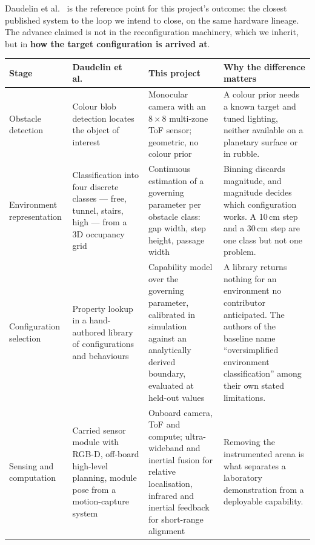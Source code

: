 \documentclass[11pt,a4paper]{article}
\newif\ifreview
\newcommand{\pending}[1]{\ifreview{\color{blue}#1}\else#1\fi}
\newenvironment{pblock}{\ifreview\color{blue}\fi}{}
\begin{document}
\pending{%
Daudelin et al.\ \cite{daudelin2018} is the reference point for this project's
outcome: the closest published system to the loop we intend to close, on the
same hardware lineage. The advance claimed is not in the reconfiguration
machinery, which we inherit, but in \textbf{how the target configuration is
arrived at}.
}

\begin{pblock}
\noindent
\begin{tabular}{@{}L{0.16\textwidth} L{0.23\textwidth} L{0.24\textwidth}
                  L{0.26\textwidth}@{}}
\toprule
\textbf{Stage} & \textbf{Daudelin et al.\ \cite{daudelin2018}} &
\textbf{This project} & \textbf{Why the difference matters} \\
\midrule
Obstacle detection &
  Colour blob detection locates the object of interest &
  Monocular camera with an $8\times8$ multi-zone ToF sensor; geometric, no
  colour prior &
  A colour prior needs a known target and tuned lighting, neither available on
  a planetary surface or in rubble. \\
Environment representation &
  Classification into four discrete classes --- free, tunnel, stairs, high ---
  from a 3D occupancy grid &
  Continuous estimation of a governing parameter per obstacle class: gap width,
  step height, passage width &
  Binning discards magnitude, and magnitude decides which configuration works.
  A 10\,cm step and a 30\,cm step are one class but not one problem. \\
Configuration selection &
  Property lookup in a hand-authored library of configurations and behaviours
  \cite{jing2018} &
  Capability model over the governing parameter, calibrated in simulation
  against an analytically derived boundary, evaluated at held-out values &
  A library returns nothing for an environment no contributor anticipated. The
  authors of the baseline name ``oversimplified environment classification''
  among their own stated limitations. \\
Sensing and computation &
  Carried sensor module with RGB-D, off-board high-level planning, module pose
  from a motion-capture system &
  Onboard camera, ToF and compute; ultra-wideband and inertial fusion for
  relative localisation, infrared and inertial feedback for short-range
  alignment &
  Removing the instrumented arena is what separates a laboratory demonstration
  from a deployable capability. \\
\bottomrule
\end{tabular}
\end{pblock}
\end{document}
